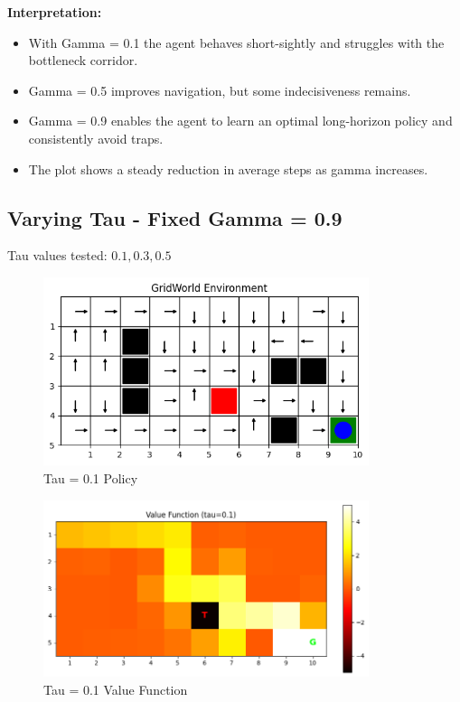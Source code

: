 \documentclass[12pt]{article}
\begin{document}
\textbf{Interpretation:}
\begin{itemize}
  \item With Gamma = 0.1 the agent behaves short-sightly and struggles with the bottleneck corridor.
  \item Gamma = 0.5 improves navigation, but some indecisiveness remains.
  \item Gamma = 0.9 enables the agent to learn an optimal long-horizon policy and consistently avoid traps.
  \item The plot shows a steady reduction in average steps as gamma increases.
\end{itemize}

\newpage
\subsection{Varying Tau - Fixed Gamma = 0.9}
Tau values tested: \(0.1, 0.3, 0.5\)

\begin{figure}[H]
  \centering
  \includegraphics[width=0.85\textwidth]{images/part2_q3_tau_0.1_policy.png}
  \caption{Tau = 0.1 Policy}
\end{figure}
\begin{figure}[H]
  \centering
  \includegraphics[width=0.85\textwidth]{images/part2_q3_tau_0.1_value.png}
  \caption{Tau = 0.1 Value Function}
\end{figure}
\end{document}
